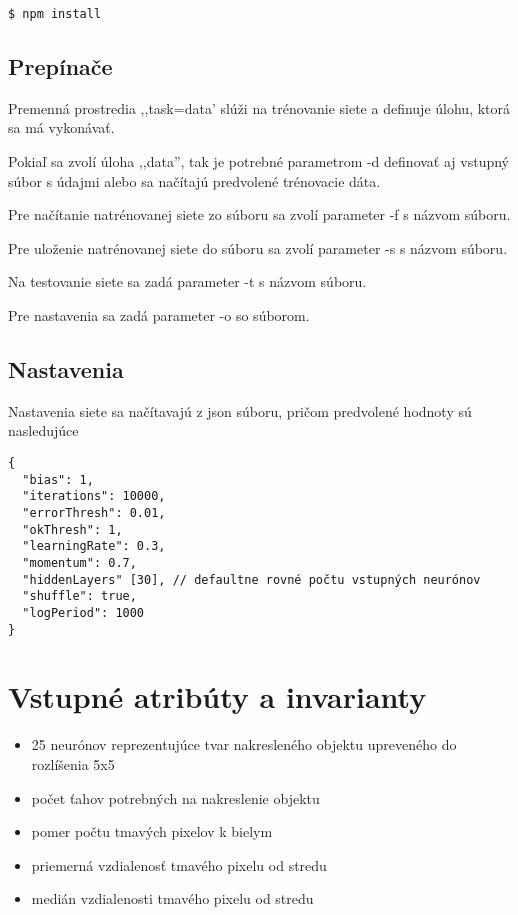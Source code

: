 \begin{verbatim}
$ npm install
\end{verbatim}


\subsection{Prepínače} %
\label{sub:prep_na_e}

Premenná prostredia ,,task=data' slúži na trénovanie siete a definuje úlohu, ktorá sa má vykonávať.

Pokiaľ sa zvolí úloha ,,data'', tak je potrebné parametrom -d definovať aj vstupný súbor s údajmi alebo sa načítajú predvolené trénovacie dáta.

Pre načítanie natrénovanej siete zo súboru sa zvolí parameter -f s názvom súboru.

Pre uloženie natrénovanej siete do súboru sa zvolí parameter -s s názvom súboru.

Na testovanie siete sa zadá parameter -t s názvom súboru.

Pre nastavenia sa zadá parameter -o so súborom.


\subsection{Nastavenia} %
\label{sub:nastavenia}

Nastavenia siete sa načítavajú z json súboru, pričom predvolené hodnoty sú nasledujúce

\begin{verbatim}
{
  "bias": 1,
  "iterations": 10000,
  "errorThresh": 0.01,
  "okThresh": 1,
  "learningRate": 0.3,
  "momentum": 0.7,
  "hiddenLayers" [30], // defaultne rovné počtu vstupných neurónov
  "shuffle": true,
  "logPeriod": 1000
}
\end{verbatim}


\section{Vstupné atribúty a invarianty} %
\label{sec:vstupn_atrib_ty}

\begin{itemize}
  \item 25 neurónov reprezentujúce tvar nakresleného objektu upreveného do rozlíšenia 5x5
  \item počet ťahov potrebných na nakreslenie objektu
  \item pomer počtu tmavých pixelov k bielym
  \item priemerná vzdialenosť tmavého pixelu od stredu
  \item medián vzdialenosti tmavého pixelu od stredu
\end{itemize}

